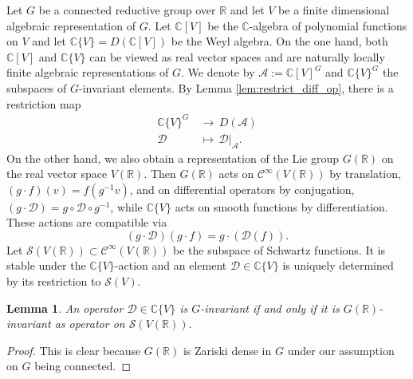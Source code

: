 \documentclass[reqno, 11pt]{amsart} %
\numberwithin{equation}{section}
\theoremstyle{plain}
\newtheorem{lemma}[theorem]{Lemma}
\theoremstyle{definition}
\theoremstyle{remark}
\newcommand{\lr}{\longrightarrow}
\newcommand{\mbC}{\mathbb{C}}
\newcommand{\mbR}{\mathbb{R}}
\newcommand{\mcA}{\mathcal{A}}
\newcommand{\mcC}{\mathcal{C}}
\newcommand{\mcD}{\mathcal{D}}
\newcommand{\mcS}{\mathcal{S}}
\begin{document}
Let $G$ be a connected reductive group over $\mbR$ and let $V$ be a finite dimensional algebraic representation of $G$. Let $\mbC[V]$ be the $\mbC$-algebra of polynomial functions on $V$ and let $\mbC\{V\} = D(\mbC[V])$ be the Weyl algebra. On the one hand, both $\mbC[V]$ and $\mbC\{V\}$ can be viewed as real vector spaces and are naturally locally finite algebraic representations of $G$. We denote by $\mcA := \mbC[V]^G$ and $\mbC\{V\}^G$ the subspaces of $G$-invariant elements. By Lemma \ref{lem:restrict_diff_op}, there is a restriction map
\begin{equation}\label{eq:restriction_diff_op_map}
\begin{aligned}
\mbC\{V\}^G & \,\lr\, D(\mcA)\\
\mcD\, & \,\longmapsto\, \mcD\vert_\mcA.
\end{aligned}
\end{equation}
On the other hand, we also obtain a representation of the Lie group $G(\mbR)$ on the real vector space $V(\mbR)$. Then $G(\mbR)$ acts on $\mcC^\infty(V(\mbR))$ by translation, $(g\cdot f)(v) = f(g^{-1}v)$, and on differential operators by conjugation, $(g\cdot \mcD) = g\circ \mcD \circ g^{-1}$, while $\mbC\{V\}$ acts on smooth functions by differentiation. These actions are compatible via
$$(g\cdot \mcD)(g\cdot f) = g\cdot (\mcD(f)).$$
Let $\mcS(V(\mbR))\subset \mcC^\infty(V(\mbR))$ be the subspace of Schwartz functions. It is stable under the $\mbC\{V\}$-action and an element $\mcD \in \mbC\{V\}$ is uniquely determined by its restriction to $\mcS(V)$.
\begin{lemma}\label{lem:invariant_diff_ops}
An operator $\mcD\in \mbC\{V\}$ is $G$-invariant if and only if it is $G(\mbR)$-invariant as operator on $\mcS(V(\mbR))$.
\end{lemma}
\begin{proof}
This is clear because $G(\mbR)$ is Zariski dense in $G$ under our assumption on $G$ being connected.
\end{proof}
\end{document}
